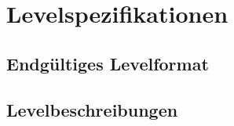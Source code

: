 \section{Levelspezifikationen}

\subsection{Endgültiges Levelformat}

\subsection{Levelbeschreibungen}